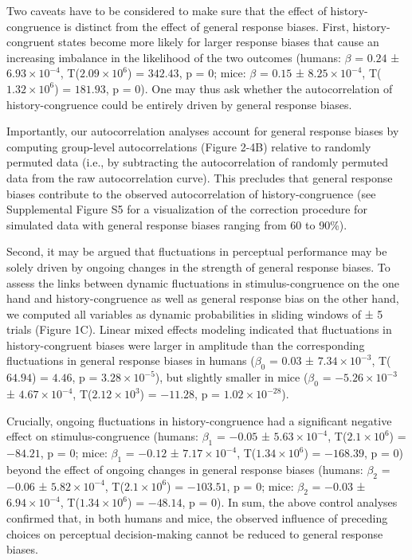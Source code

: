 \documentclass[
]{article}
\begin{document}
Two caveats have to be considered to make sure that the effect of
history-congruence is distinct from the effect of general response
biases. First, history-congruent states become more likely for larger
response biases that cause an increasing imbalance in the likelihood of
the two outcomes (humans: \(\beta\) = \(0.24\) ±
\(\ensuremath{6.93\times 10^{-4}}\),
T(\(\ensuremath{2.09\times 10^{6}}\)) = \(342.43\), p = \(0\); mice:
\(\beta\) = \(0.15\) ± \(\ensuremath{8.25\times 10^{-4}}\),
T(\(\ensuremath{1.32\times 10^{6}}\)) = \(181.93\), p = \(0\)). One may
thus ask whether the autocorrelation of history-congruence could be
entirely driven by general response biases.

Importantly, our autocorrelation analyses account for general response
biases by computing group-level autocorrelations (Figure 2-4B) relative
to randomly permuted data (i.e., by subtracting the autocorrelation of
randomly permuted data from the raw autocorrelation curve). This
precludes that general response biases contribute to the observed
autocorrelation of history-congruence (see Supplemental Figure S5 for a
visualization of the correction procedure for simulated data with
general response biases ranging from 60 to 90\%).

Second, it may be argued that fluctuations in perceptual performance may
be solely driven by ongoing changes in the strength of general response
biases. To assess the links between dynamic fluctuations in
stimulus-congruence on the one hand and history-congruence as well as
general response bias on the other hand, we computed all variables as
dynamic probabilities in sliding windows of ± 5 trials (Figure 1C).
Linear mixed effects modeling indicated that fluctuations in
history-congruent biases were larger in amplitude than the corresponding
fluctuations in general response biases in humans (\(\beta_0\) =
\(0.03\) ± \(\ensuremath{7.34\times 10^{-3}}\), T(\(64.94\)) = \(4.46\),
p = \(\ensuremath{3.28\times 10^{-5}}\)), but slightly smaller in mice
(\(\beta_0\) = \(\ensuremath{-5.26\times 10^{-3}}\) ±
\(\ensuremath{4.67\times 10^{-4}}\),
T(\(\ensuremath{2.12\times 10^{3}}\)) = \(-11.28\), p =
\(\ensuremath{1.02\times 10^{-28}}\)).

Crucially, ongoing fluctuations in history-congruence had a significant
negative effect on stimulus-congruence (humans: \(\beta_1\) = \(-0.05\)
± \(\ensuremath{5.63\times 10^{-4}}\),
T(\(\ensuremath{2.1\times 10^{6}}\)) = \(-84.21\), p = \(0\); mice:
\(\beta_1\) = \(-0.12\) ± \(\ensuremath{7.17\times 10^{-4}}\),
T(\(\ensuremath{1.34\times 10^{6}}\)) = \(-168.39\), p = \(0\)) beyond
the effect of ongoing changes in general response biases (humans:
\(\beta_2\) = \(-0.06\) ± \(\ensuremath{5.82\times 10^{-4}}\),
T(\(\ensuremath{2.1\times 10^{6}}\)) = \(-103.51\), p = \(0\); mice:
\(\beta_2\) = \(-0.03\) ± \(\ensuremath{6.94\times 10^{-4}}\),
T(\(\ensuremath{1.34\times 10^{6}}\)) = \(-48.14\), p = \(0\)). In sum,
the above control analyses confirmed that, in both humans and mice, the
observed influence of preceding choices on perceptual decision-making
cannot be reduced to general response biases.
\end{document}
